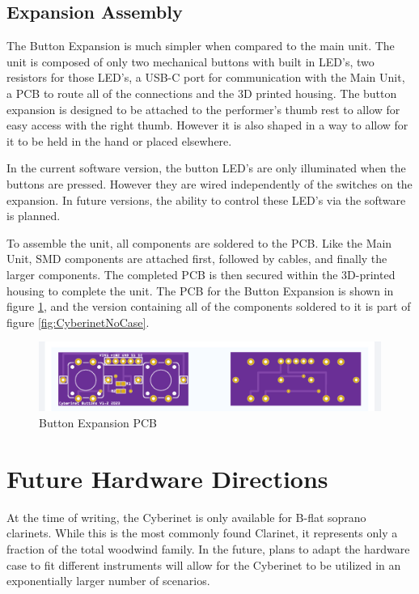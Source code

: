 \subsection{Expansion Assembly}

The Button Expansion is much simpler when compared to the main unit. The unit is composed of only two mechanical buttons with built in LED's, two resistors for those LED's, a USB-C port for communication with the Main Unit, a PCB to route all of the connections and the 3D printed housing. The button expansion is designed to be attached to the performer's thumb rest to allow for easy access with the right thumb. However it is also shaped in a way to allow for it to be held in the hand or placed elsewhere.

In the current software version, the button LED's are only illuminated when the buttons are pressed. However they are wired independently of the switches on the expansion. In future versions, the ability to control these LED's via the software is planned.

To assemble the unit, all components are soldered to the PCB. Like the Main Unit, SMD components are attached first, followed by cables, and finally the larger components. The completed PCB is then secured within the 3D-printed housing to complete the unit. The PCB for the Button Expansion is shown in figure \ref{fig:buttonPCB}, and the version containing all of the components soldered to it is part of figure \ref{fig:CyberinetNoCase}.


\begin{center}
    \begin{figure}
        \centering
        \includegraphics[scale=0.5]{diagrams/PCBs/buttons1.2.png}
        \caption{Button Expansion PCB}
        \label{fig:buttonPCB}
    \end{figure}
\end{center}


\section{Future Hardware Directions}
At the time of writing, the Cyberinet is only available for B-flat soprano clarinets. While this is the most commonly found Clarinet, it represents only a fraction of the total woodwind family. In the future, plans to adapt the hardware case to fit different instruments will allow for the Cyberinet to be utilized in an exponentially larger number of scenarios. 

